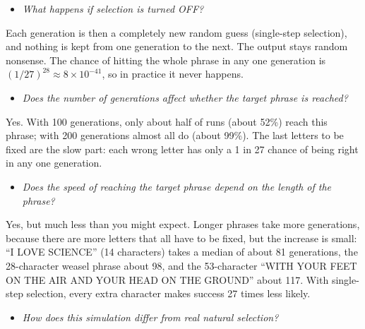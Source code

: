 \documentclass[
  a4paper]{book}
\providecommand{\tightlist}{%
  \setlength{\itemsep}{0pt}\setlength{\parskip}{0pt}}
\begin{document}
\begin{itemize}
\tightlist
\item
  \emph{What happens if selection is turned OFF?}
\end{itemize}

Each generation is then a completely new random guess (single-step selection), and nothing is kept from one generation to the next. The output stays random nonsense. The chance of hitting the whole phrase in any one generation is \((1/27)^{28} \approx 8 \times 10^{-41}\), so in practice it never happens.

\begin{itemize}
\tightlist
\item
  \emph{Does the number of generations affect whether the target phrase is reached?}
\end{itemize}

Yes. With 100 generations, only about half of runs (about 52\%) reach this phrase; with 200 generations almost all do (about 99\%). The last letters to be fixed are the slow part: each wrong letter has only a 1 in 27 chance of being right in any one generation.

\begin{itemize}
\tightlist
\item
  \emph{Does the speed of reaching the target phrase depend on the length of the phrase?}
\end{itemize}

Yes, but much less than you might expect. Longer phrases take more generations, because there are more letters that all have to be fixed, but the increase is small: ``I LOVE SCIENCE'' (14 characters) takes a median of about 81 generations, the 28-character weasel phrase about 98, and the 53-character ``WITH YOUR FEET ON THE AIR AND YOUR HEAD ON THE GROUND'' about 117. With single-step selection, every extra character makes success 27 times less likely.

\begin{itemize}
\tightlist
\item
  \emph{How does this simulation differ from real natural selection?}
\end{itemize}
\end{document}
